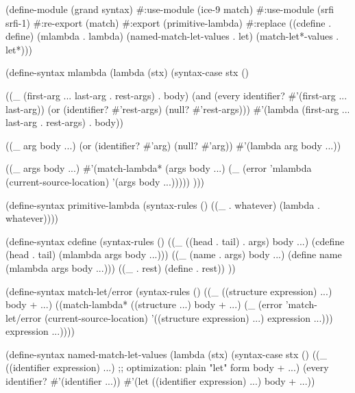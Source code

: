 \begin{Snippet}
(define-module (grand syntax)
  #:use-module (ice-9 match)
  #:use-module (srfi srfi-1)
  #:re-export (match)
  #:export (primitive-lambda)
  #:replace ((cdefine . define)
	     (mlambda . lambda)
	     (named-match-let-values . let)
	     (match-let*-values . let*)))
\end{Snippet}
\begin{Snippet}
(define-syntax mlambda
  (lambda (stx)
    (syntax-case stx ()
\end{Snippet}
\begin{Snippet}
      ((_ (first-arg ... last-arg . rest-args) . body)
       (and (every identifier? #'(first-arg ... last-arg))
	    (or (identifier? #'rest-args) (null? #'rest-args)))
       #'(lambda (first-arg ... last-arg . rest-args) . body))
\end{Snippet}
\begin{Snippet}
      ((_ arg body ...)
       (or (identifier? #'arg) (null? #'arg))
       #'(lambda arg body ...))
\end{Snippet}
\begin{Snippet}
      ((_ args body ...)
       #'(match-lambda* (args body ...) 
        (_ (error 'mlambda (current-source-location)
                  '(args body ...)))))
      )))
\end{Snippet}
\begin{Snippet}
(define-syntax primitive-lambda
  (syntax-rules ()
    ((_ . whatever)
     (lambda . whatever))))
\end{Snippet}
\begin{Snippet}
(define-syntax cdefine
  (syntax-rules ()
    ((_ ((head . tail) . args) body ...)
     (cdefine (head . tail)
       (mlambda args body ...)))
    ((_ (name . args) body ...)
     (define name (mlambda args body ...)))
    ((_ . rest)
     (define . rest))
    ))
\end{Snippet}
\begin{Snippet}
(define-syntax match-let/error
  (syntax-rules ()
    ((_ ((structure expression) ...)
	body + ...)
     ((match-lambda* ((structure ...) body + ...)
	(_ (error 'match-let/error (current-source-location) 
		  '((structure expression) ...)
		  expression ...)))
      expression ...))))
\end{Snippet}
\begin{Snippet}
(define-syntax named-match-let-values
  (lambda (stx)
    (syntax-case stx ()
      ((_ ((identifier expression) ...) ;; optimization: plain "let" form
	  body + ...)
       (every identifier? #'(identifier ...))
       #'(let ((identifier expression) ...)
	   body + ...))
\end{Snippet}
